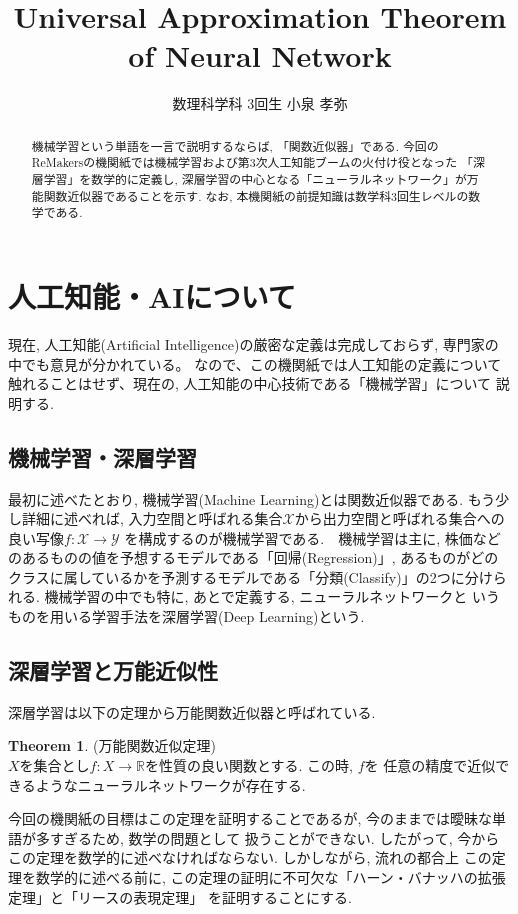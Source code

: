 \documentclass[11pt, a4paper, dvipdfmx]{jsarticle}
\title{Universal Approximation Theorem of Neural Network}
\author{数理科学科 3回生 小泉 孝弥}
\date{}
\theoremstyle{definition}
\newtheorem*{Theorem*}{Theorem}
\newcommand{\R}{\mathbb{R}}
\newcommand{\X}{\mathcal{X}}
\newcommand{\Y}{\mathcal{Y}}
\begin{document}
\maketitle
\begin{abstract}
    機械学習という単語を一言で説明するならば, 「関数近似器」である.
    今回のReMakersの機関紙では機械学習および第3次人工知能ブームの火付け役となった
    「深層学習」を数学的に定義し, 深層学習の中心となる「ニューラルネットワーク」が万能関数近似器であることを示す.
    なお, 本機関紙の前提知識は数学科3回生レベルの数学である.
\end{abstract}
\section{人工知能・AIについて}
現在, 人工知能(Artificial Intelligence)の厳密な定義は完成しておらず, 専門家の中でも意見が分かれている。
なので、この機関紙では人工知能の定義について触れることはせず、現在の, 人工知能の中心技術である「機械学習」について
説明する.
\subsection{機械学習・深層学習}
最初に述べたとおり, 機械学習(Machine Learning)とは関数近似器である. 
もう少し詳細に述べれば, 入力空間と呼ばれる集合$\X$から出力空間と呼ばれる集合への良い写像$f:\X\to\Y$
を構成するのが機械学習である.　機械学習は主に, 株価などのあるものの値を予想するモデルである「回帰(Regression)」, 
あるものがどのクラスに属しているかを予測するモデルである「分類(Classify)」の2つに分けられる. 機械学習の中でも特に, あとで定義する, ニューラルネットワークと
いうものを用いる学習手法を深層学習(Deep Learning)という.
\subsection{深層学習と万能近似性}
深層学習は以下の定理から万能関数近似器と呼ばれている. 
\begin{Theorem*}(万能関数近似定理)\\
    $X$を集合とし$f:X\to\R$を性質の良い関数とする. この時, $f$を
    任意の精度で近似できるようなニューラルネットワークが存在する.
\end{Theorem*}
今回の機関紙の目標はこの定理を証明することであるが, 今のままでは曖昧な単語が多すぎるため, 数学の問題として
扱うことができない. したがって, 今からこの定理を数学的に述べなければならない. しかしながら, 流れの都合上
この定理を数学的に述べる前に, この定理の証明に不可欠な「ハーン・バナッハの拡張定理」と「リースの表現定理」
を証明することにする.
\end{document}
